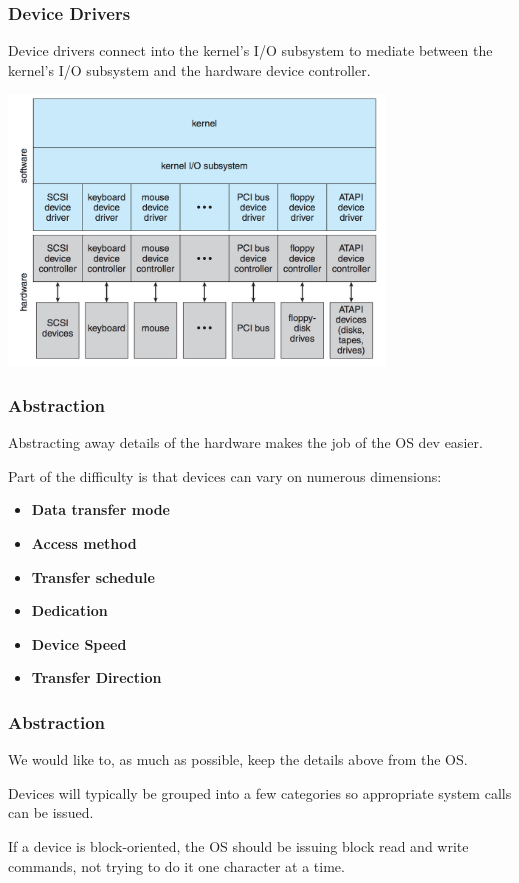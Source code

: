 \begin{frame}
\frametitle{Device Drivers}

Device drivers connect into the kernel's I/O subsystem to mediate between the kernel's I/O subsystem and the hardware device controller. 

\begin{center}
	\includegraphics[width=0.75\textwidth]{images/kernel-io-structure.png}
\end{center}


\end{frame}

\begin{frame}
\frametitle{Abstraction}

Abstracting away details of the hardware makes the job of the OS dev easier.

Part of the difficulty is that devices can vary on numerous dimensions:

\begin{itemize}
\item \textbf{Data transfer mode}
\item \textbf{Access method}
\item \textbf{Transfer schedule}
\item \textbf{Dedication}
\item \textbf{Device Speed}
\item \textbf{Transfer Direction}
\end{itemize}

\end{frame}

\begin{frame}
\frametitle{Abstraction}

We would like to, as much as possible, keep the details above from the OS.

Devices will typically be grouped into a few categories so appropriate system calls can be issued. 

If a device is block-oriented, the OS should be issuing block read and write commands, not trying to do it one character at a time.


\end{frame}

